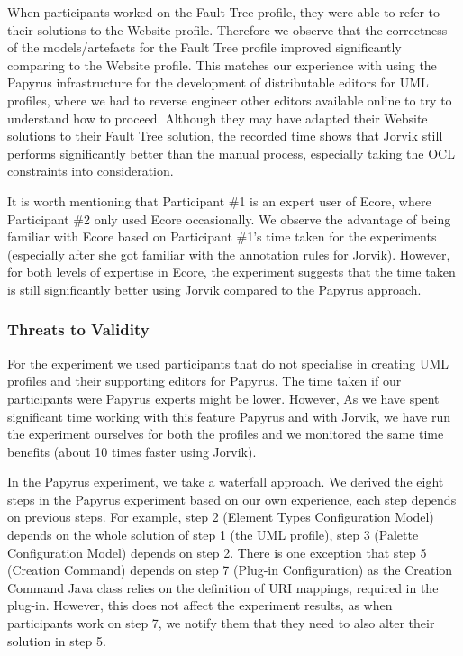 When participants worked on the Fault Tree profile, they were able to refer to their solutions to the Website profile. 
Therefore we observe that the correctness of the models/artefacts for the Fault Tree profile improved significantly comparing to the Website profile. This matches our experience with using the Papyrus infrastructure for the development of distributable editors for UML profiles, where we had to reverse engineer other editors available online to try to understand how to proceed.
Although they may have adapted their Website solutions to their Fault Tree solution, the recorded time shows that Jorvik still performs significantly better than the manual process, especially taking the OCL constraints into consideration.

It is worth mentioning that Participant \#1 is an expert user of Ecore, where Participant \#2 only used Ecore occasionally. 
We observe the advantage of being familiar with Ecore based on Participant \#1's time taken for the experiments (especially after she got familiar with the annotation rules for Jorvik).
However, for both levels of expertise in Ecore, the experiment suggests that the time taken is still significantly better using Jorvik compared to the Papyrus approach.

\subsubsection{Threats to Validity}
For the experiment we used participants that do not specialise in creating UML profiles and their supporting editors for Papyrus. The time taken if our participants were Papyrus experts might be lower.
However, As we have spent significant time working with this feature Papyrus and with Jorvik, we have run the experiment ourselves for both the profiles and we monitored the same time benefits (about 10 times faster using Jorvik). 

In the Papyrus experiment, we take a waterfall approach.
We derived the eight steps in the Papyrus experiment based on our own experience, each step depends on previous steps. 
For example, step 2 (Element Types Configuration Model) depends on the whole solution of step 1 (the UML profile), step 3 (Palette Configuration Model) depends on step 2. 
There is one exception that step 5 (Creation Command) depends on step 7 (Plug-in Configuration) as the Creation Command Java class relies on the definition of URI mappings, required in the plug-in. 
However, this does not affect the experiment results, as when participants work on step 7, we notify them that they need to also alter their solution in step 5.

